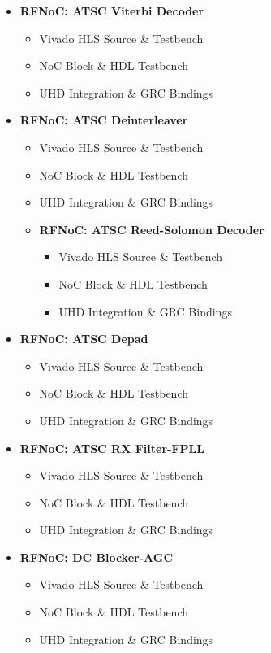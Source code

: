 \documentclass{article}
\begin{document}
\begin{itemize}
\item \textbf{RFNoC: ATSC Viterbi Decoder}
	\begin{itemize}
	\item Vivado HLS Source \& Testbench
	\item NoC Block \& HDL Testbench
	\item UHD Integration \& GRC Bindings
	\end{itemize}

\item \textbf{RFNoC: ATSC Deinterleaver}
	\begin{itemize}
	\item Vivado HLS Source \& Testbench
	\item NoC Block \& HDL Testbench
	\item UHD Integration \& GRC Bindings
	\end{itemize}

\begin{itemize}
\item \textbf{RFNoC: ATSC Reed-Solomon Decoder}
	\begin{itemize}
	\item Vivado HLS Source \& Testbench
	\item NoC Block \& HDL Testbench
	\item UHD Integration \& GRC Bindings
	\end{itemize}
\end{itemize}

\item \textbf{RFNoC: ATSC Depad}
	\begin{itemize}
	\item Vivado HLS Source \& Testbench
	\item NoC Block \& HDL Testbench
	\item UHD Integration \& GRC Bindings
	\end{itemize}

\item \textbf{RFNoC: ATSC RX Filter-FPLL}
	\begin{itemize}
	\item Vivado HLS Source \& Testbench
	\item NoC Block \& HDL Testbench
	\item UHD Integration \& GRC Bindings
	\end{itemize}

\item \textbf{RFNoC: DC Blocker-AGC}
	\begin{itemize}
	\item Vivado HLS Source \& Testbench
	\item NoC Block \& HDL Testbench
	\item UHD Integration \& GRC Bindings
	\end{itemize}
\end{itemize}
\end{document}

